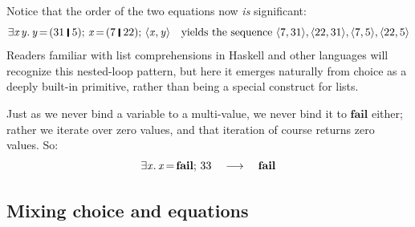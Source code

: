 \documentclass[acmsmall]{acmart}
\newcommand{\Varid}[1]{\mathit{#1}}
\begin{document}
Notice that the order of the two equations now \emph{is} significant:
$$
\ensuremath{\exists\Varid{x}\hspace{0.1em}\Varid{y}.\,\Varid{y}\hspace{-0.14em}=\hspace{-0.14em}(\mathrm{31}\;\rule[-0.1em]{0.15em}{0.75em}\;\mathrm{5});\,\Varid{x}\hspace{-0.14em}=\hspace{-0.14em}(\mathrm{7}\;\rule[-0.1em]{0.15em}{0.75em}\;\mathrm{22});\,\langle{}\Varid{x},\Varid{y}\rangle}
\quad
\text{yields the sequence \ensuremath{\langle{}\mathrm{7},\mathrm{31}\rangle,\langle{}\mathrm{22},\mathrm{31}\rangle,\langle{}\mathrm{7},\mathrm{5}\rangle,\langle{}\mathrm{22},\mathrm{5}\rangle}}
$$
Readers familiar with list comprehensions in Haskell and other
languages will recognize this nested-loop pattern, but here it
emerges naturally from choice as a deeply built-in primitive,
rather than being a special construct for lists.

Just as we never bind a variable to a multi-value, we never bind it to \ensuremath{\textbf{fail}} either; rather
we iterate over zero values, and that iteration of course returns zero
values.  So:
$$
\ensuremath{\exists\Varid{x}.\,\Varid{x}\hspace{-0.14em}=\hspace{-0.14em}\textbf{fail};\,\mathrm{33}} \quad \movesto \quad \ensuremath{\textbf{fail}}
$$

\subsection{Mixing choice and equations} \label{sec:mixing}
\end{document}
